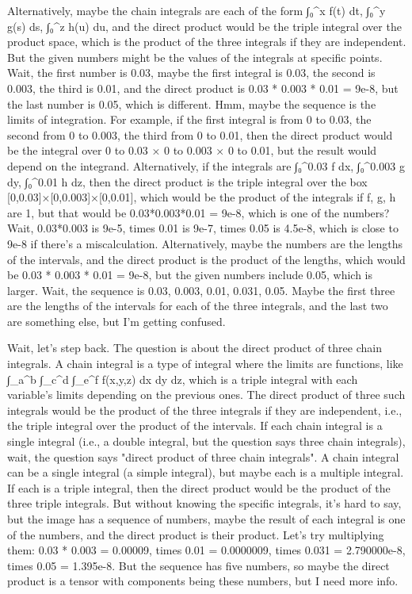Alternatively, maybe the chain integrals are each of the form ∫₀^x f(t) dt, ∫₀^y g(s) ds, ∫₀^z h(u) du, and the direct product would be the triple integral over the product space, which is the product of the three integrals if they are independent. But the given numbers might be the values of the integrals at specific points. Wait, the first number is 0.03, maybe the first integral is 0.03, the second is 0.003, the third is 0.01, and the direct product is 0.03 * 0.003 * 0.01 = 9e-8, but the last number is 0.05, which is different. Hmm, maybe the sequence is the limits of integration. For example, if the first integral is from 0 to 0.03, the second from 0 to 0.003, the third from 0 to 0.01, then the direct product would be the integral over 0 to 0.03 × 0 to 0.003 × 0 to 0.01, but the result would depend on the integrand. Alternatively, if the integrals are ∫₀^0.03 f dx, ∫₀^0.003 g dy, ∫₀^0.01 h dz, then the direct product is the triple integral over the box [0,0.03]×[0,0.003]×[0,0.01], which would be the product of the integrals if f, g, h are 1, but that would be 0.03*0.003*0.01 = 9e-8, which is one of the numbers? Wait, 0.03*0.003 is 9e-5, times 0.01 is 9e-7, times 0.05 is 4.5e-8, which is close to 9e-8 if there's a miscalculation. Alternatively, maybe the numbers are the lengths of the intervals, and the direct product is the product of the lengths, which would be 0.03 * 0.003 * 0.01 = 9e-8, but the given numbers include 0.05, which is larger. Wait, the sequence is 0.03, 0.003, 0.01, 0.031, 0.05. Maybe the first three are the lengths of the intervals for each of the three integrals, and the last two are something else, but I'm getting confused.

Wait, let's step back. The question is about the direct product of three chain integrals. A chain integral is a type of integral where the limits are functions, like ∫_a^b ∫_c^d ∫_e^f f(x,y,z) dx dy dz, which is a triple integral with each variable's limits depending on the previous ones. The direct product of three such integrals would be the product of the three integrals if they are independent, i.e., the triple integral over the product of the intervals. If each chain integral is a single integral (i.e., a double integral, but the question says three chain integrals), wait, the question says "direct product of three chain integrals". A chain integral can be a single integral (a simple integral), but maybe each is a multiple integral. If each is a triple integral, then the direct product would be the product of the three triple integrals. But without knowing the specific integrals, it's hard to say, but the image has a sequence of numbers, maybe the result of each integral is one of the numbers, and the direct product is their product. Let's try multiplying them: 0.03 * 0.003 = 0.00009, times 0.01 = 0.0000009, times 0.031 = 2.790000e-8, times 0.05 = 1.395e-8. But the sequence has five numbers, so maybe the direct product is a tensor with components being these numbers, but I need more info.

